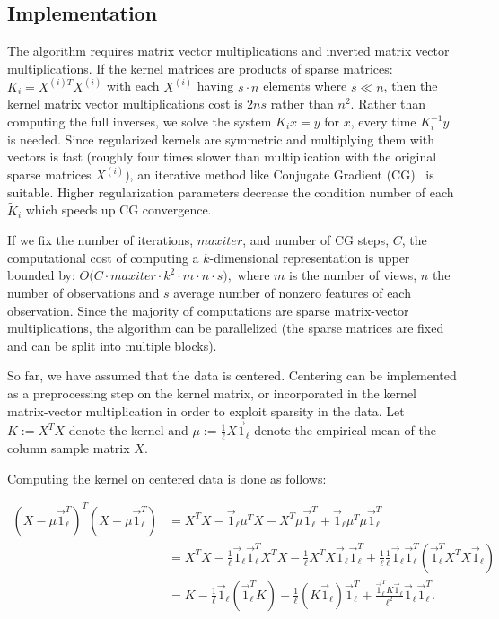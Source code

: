 \subsection{Implementation}\label{chap:extensions:implementation}
The algorithm requires matrix vector multiplications and inverted
matrix vector multiplications. If the kernel matrices are products of
sparse matrices: $K_i = X^{(i)T} X^{(i)}$ with each $X^{(i)}$ having
$s\cdot n$ elements
where $s \ll n$, then the kernel matrix vector multiplications cost is $2 n s$
rather than $n^2$. Rather than computing the full inverses, we solve
the system $K_i x = y$ for $x$, every time $K_i^{-1} y$ is needed. Since
regularized kernels are symmetric and multiplying them with vectors is
fast (roughly four times slower than multiplication with the original
sparse matrices $X^{(i)}$), an iterative method like Conjugate Gradient (CG)~\cite{golub} is
suitable. Higher regularization parameters decrease the condition
number of each $\tilde{K}_i$ which speeds up CG convergence.
\par
If we fix the number of iterations, $maxiter$, and number
of CG steps, $C$, the computational cost of computing a
$k$-dimensional representation is upper bounded by: $O\big(C \cdot
maxiter \cdot k^2 \cdot m \cdot n \cdot s \big),$ where $m$ is the
number of views, $n$ the number of observations and $s$ average number
of nonzero features of each observation.
Since the majority of computations are  sparse matrix-vector multiplications, the
algorithm can be parallelized (the sparse matrices are fixed and can be split into multiple
blocks).

So far, we have assumed that the data is centered. Centering can be implemented
as a preprocessing step on the kernel matrix, or incorporated in the kernel
matrix-vector multiplication in order to exploit sparsity in the data.
Let $K := X^T X$ denote the kernel and $\mu := \frac{1}{\ell} X \vec{1}_\ell$
denote the empirical mean of the column sample matrix $X$.

Computing the kernel on centered data is done as follows:

\begin{align}
 (X - \mu \vec{1}_\ell^T)^T (X - \mu \vec{1}_\ell^T) 
 & = X^T X  - \vec{1}_\ell \mu^T X  - X^T \mu \vec{1}_\ell^T  +  \vec{1}_\ell \mu^T \mu \vec{1}_\ell^T  \nonumber \\
&  = X^T X - \frac{1}{\ell} \vec{1}_\ell \vec{1}_\ell^T X^T X  -  \frac{1}{\ell} X^T X \vec{1}_\ell \vec{1}_\ell^T
+ \frac{1}{\ell} \frac{1}{\ell} \vec{1}_\ell \vec{1}_\ell^T (\vec{1}_\ell^T X^T X \vec{1}_\ell) \nonumber \\
&  = K - \frac{1}{\ell} \vec{1}_\ell (\vec{1}_\ell^T K) - \frac{1}{\ell} (K \vec{1}_\ell)\vec{1}_\ell^T +
\frac{\vec{1}_\ell^T K \vec{1}_\ell}{\ell^2} \vec{1}_\ell \vec{1}_\ell^T. \nonumber
\end{align}

